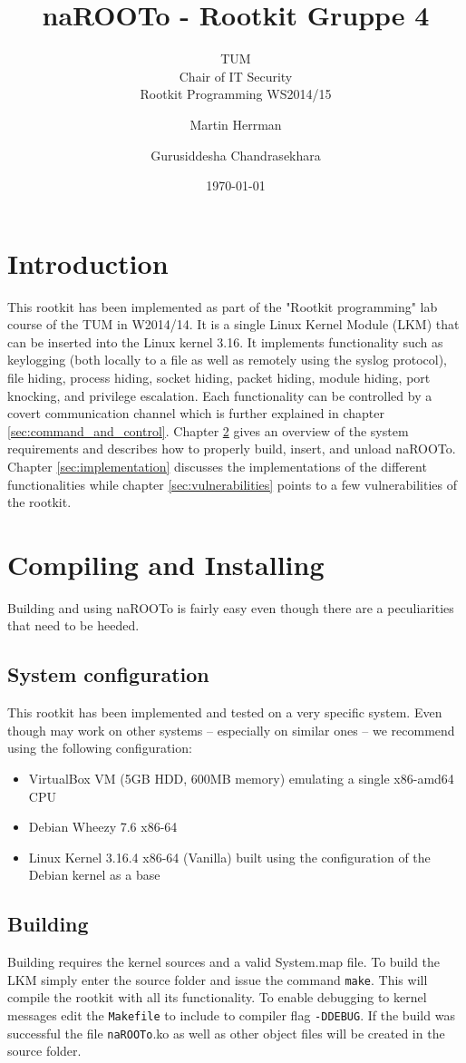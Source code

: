 \documentclass[10pt, letterpaper]{scrartcl}
\title{naROOTo - Rootkit Gruppe 4}
\subtitle{TUM \\Chair of IT Security\\  Rootkit Programming WS2014/15}
\author{Martin Herrman \and Gurusiddesha Chandrasekhara}
\date{\today}
\begin{document}
\maketitle
\tableofcontents
\newpage

\section{Introduction}
This rootkit has been implemented as part of the "Rootkit programming" lab course of the TUM in W2014/14. 
It is a single Linux Kernel Module (LKM) that can be inserted into the Linux kernel 3.16. 
It implements functionality such as keylogging (both locally to a file as well as remotely using the syslog protocol), file hiding, process hiding, socket hiding, packet hiding, module hiding, port knocking, and privilege escalation. Each functionality can be controlled by a covert communication channel which is further explained in chapter \ref{sec:command_and_control}.
Chapter \ref{sec:compiling_and_installing} gives an overview of the system requirements and describes how to properly build, insert, and unload naROOTo.
Chapter \ref{sec:implementation} discusses the implementations of the different functionalities while chapter \ref{sec:vulnerabilities} points to a few vulnerabilities of the rootkit.

\section{Compiling and Installing}\label{sec:compiling_and_installing}
Building and using naROOTo is fairly easy even though there are a peculiarities that need to be heeded.
\subsection{System configuration}
This rootkit has been implemented and tested on a very specific system. Even though may work on other systems -- especially on similar ones -- we recommend using the following configuration:
\begin{itemize}
    \item VirtualBox VM (5GB HDD, 600MB memory) emulating a single x86-amd64 CPU
    \item Debian Wheezy 7.6 x86-64
    \item Linux Kernel 3.16.4 x86-64 (Vanilla) built using the configuration of the Debian kernel as a base
\end{itemize}

\subsection{Building}
Building requires the kernel sources and a valid System.map file. To build the LKM simply enter the source folder and issue the command \texttt{make}.
This will compile the rootkit with all its functionality. To enable debugging to kernel messages edit the \texttt{Makefile} to include to compiler flag \texttt{-DDEBUG}.
If the build was successful the file \texttt{naROOTo}.ko as well as other object files will be created in the source folder.
\end{document}
